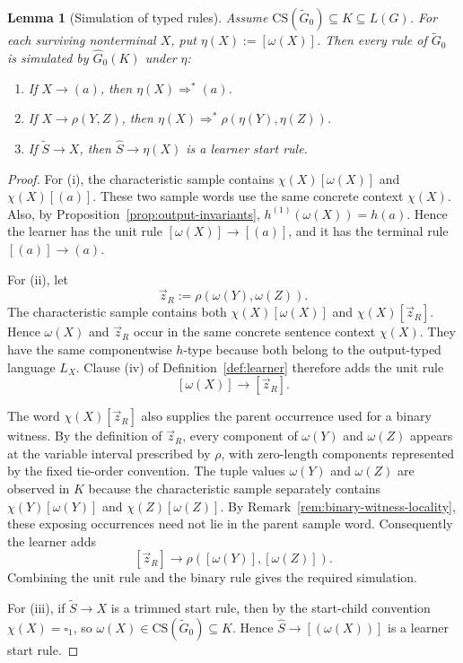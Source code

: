 \documentclass[11pt,a4paper]{article}
\newtheorem{lemma}[theorem]{Lemma}
\theoremstyle{remark}
\newcommand{\CS}{\mathrm{CS}}
\newcommand{\tuple}[1]{\vec{#1}}
\newcommand{\blank}{\square}
\begin{document}
\begin{lemma}[Simulation of typed rules]
\label{lem:rule-simulation}
Assume \(\CS(\widetilde G_0)\subseteq K\subseteq L(G)\).  For each surviving
nonterminal \(X\), put \(\eta(X):=[\omega(X)]\).  Then every rule of
\(\widetilde G_0\) is simulated by \(\widehat G_0(K)\) under \(\eta\):
\begin{enumerate}[label=(\roman*),leftmargin=*]
\item If \(X\to(a)\), then \(\eta(X)\Rightarrow^*(a)\).
\item If \(X\to\rho(Y,Z)\), then
\(\eta(X)\Rightarrow^*\rho(\eta(Y),\eta(Z))\).
\item If \(\widetilde S\to X\), then \(\widehat S\to\eta(X)\) is a learner
start rule.
\end{enumerate}
\end{lemma}

\begin{proof}
For (i), the characteristic sample contains \(\chi(X)[\omega(X)]\) and
\(\chi(X)[(a)]\).  These two sample words use the same concrete context
\(\chi(X)\).  Also, by Proposition~\ref{prop:output-invariants},
\(h^{(1)}(\omega(X))=h(a)\).  Hence the learner has the unit rule
\([\omega(X)]\to[(a)]\), and it has the terminal rule \([(a)]\to(a)\).

For (ii), let
\[
  \tuple z_R:=\rho(\omega(Y),\omega(Z)).
\]
The characteristic sample contains both
\(\chi(X)[\omega(X)]\) and \(\chi(X)[\tuple z_R]\).  Hence
\(\omega(X)\) and \(\tuple z_R\) occur in the same concrete sentence context
\(\chi(X)\).  They have the same componentwise \(h\)-type because both belong
to the output-typed language \(L_X\).  Clause (iv) of
Definition~\ref{def:learner} therefore adds the unit rule
\[
  [\omega(X)]\to[\tuple z_R].
\]

The word \(\chi(X)[\tuple z_R]\) also supplies the parent occurrence used for
a binary witness.  By the definition of \(\tuple z_R\), every component of
\(\omega(Y)\) and \(\omega(Z)\) appears at the variable interval prescribed by
\(\rho\), with zero-length components represented by the fixed tie-order
convention.  The tuple values \(\omega(Y)\) and \(\omega(Z)\) are observed in
\(K\) because the characteristic sample separately contains
\(\chi(Y)[\omega(Y)]\) and \(\chi(Z)[\omega(Z)]\).  By
Remark~\ref{rem:binary-witness-locality}, these exposing occurrences need not
lie in the parent sample word.  Consequently the learner adds
\[
  [\tuple z_R]\to\rho([\omega(Y)],[\omega(Z)]).
\]
Combining the unit rule and the binary rule gives the required simulation.

For (iii), if \(\widetilde S\to X\) is a trimmed start rule, then by the
start-child convention \(\chi(X)=\blank_1\), so \(\omega(X)\in\CS(\widetilde
G_0)\subseteq K\).  Hence \(\widehat S\to[(\omega(X))]\) is a learner start
rule.
\end{proof}
\end{document}
